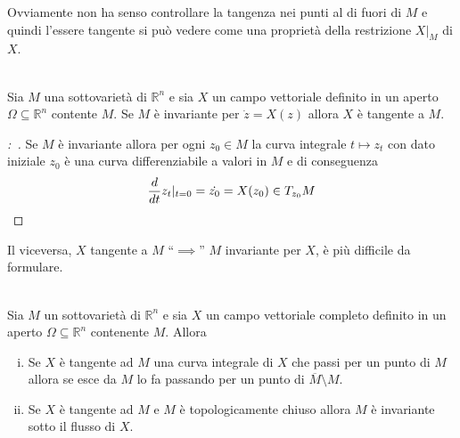 \documentclass[11pt,a4paper,twoside]{book}
\newenvironment{proposizione}[1][\empty]{\begin{Proposizione}{
\ifx\empty#1\relax\else\mdseries\itshape#1\\\fi
}{}}{\end{Proposizione}}
\newenvironment{dimo}[1][\proofname]{
	\begin{tcolorbox}[
	breakable, 
	enhanced, 
	interior hidden, 
	frame hidden, 
	borderline west = {1pt}{0pt}{gray}, 
	top=0pt, bottom=0pt, left=0pt]
\begin{proof}[#1:~]
}
{
\end{proof}
\end{tcolorbox}
}
\theoremstyle{esss}
\theoremstyle{dotless}
\numberwithin{equation}{section} %
\begin{document}
Ovviamente non ha senso controllare la tangenza nei punti al di fuori di $M$ e quindi l'essere tangente si può vedere come una proprietà della restrizione $X|_{M}$ di $X$.

\begin{proposizione}
Sia $M$ una sottovarietà di $\mathbb{R}^n$ e sia $X$ un campo vettoriale definito in un aperto $\Omega\subseteq\mathbb{R}^n$ contente $M$.
Se $M$ è invariante per $\dot{z}=X(z)$ allora $X$ è tangente a $M$. 
\end{proposizione}
\begin{dimo}
Se $M$ è invariante allora per ogni $z_0\in M$ la curva integrale $t\mapsto z_t$ con dato iniziale $z_0$ è una curva differenziabile a valori in $M$ e di conseguenza
\[
\dfrac{d}{dt}z_t|_{t=0}=\dot{z_0}=X(z_0)\in T_{z_0}M \qedhere
\]
\end{dimo}

Il viceversa, $X$ tangente a $M$ ``$\implies$'' $M$ invariante per $X$, è più difficile da formulare.

\begin{proposizione}
Sia $M$ un sottovarietà di $\mathbb{R}^n$ e sia $X$ un campo vettoriale completo definito in un aperto $\Omega\subseteq\mathbb{R}^n$ contenente $M$. Allora 
\begin{enumerate}[i.]
\item Se $X$ è tangente ad $M$ una curva integrale di $X$ che passi per un punto di $M$ allora se esce da $M$ lo fa passando per un punto di $\overline{M}\setminus M$.
\item Se $X$ è tangente ad $M$ e $M$ è topologicamente chiuso allora $M$ è invariante sotto il flusso di $X$.
\end{enumerate}
\end{proposizione}
\end{document}
